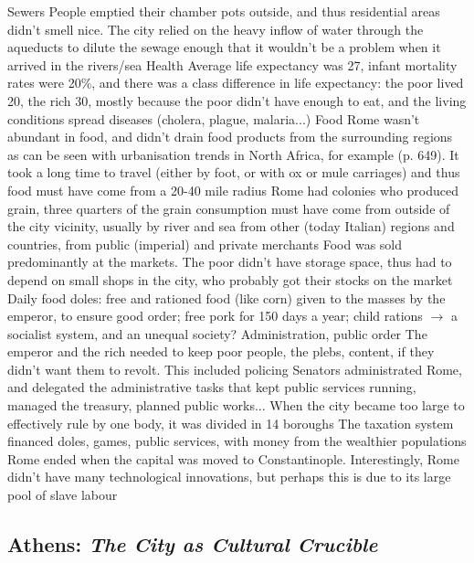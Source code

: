 \documentclass{article}
\begin{document}
\begin{outline}
	\1 Sewers
		\2 People emptied their chamber pots outside, and thus residential areas didn't smell nice. The city relied on the heavy inflow of water through the aqueducts to dilute the sewage enough that it wouldn't be a problem when it arrived in the rivers/sea
	\1 Health
		\2 Average life expectancy was 27, infant mortality rates were 20\%, and there was a class difference in life expectancy: the poor lived 20, the rich 30, mostly because the poor didn't have enough to eat, and the living conditions spread diseases (cholera, plague, malaria...)
	\1 Food
		\2 Rome wasn't abundant in food, and didn't drain food products from the surrounding regions as can be seen with urbanisation trends in North Africa, for example (p. 649). It took a long time to travel (either by foot, or with ox or mule carriages) and thus food must have come from a 20-40 mile radius
		\2 Rome had colonies who produced grain, three quarters of the grain consumption must have come from outside of the city vicinity, usually by river and sea from other (today Italian) regions and countries, from public (imperial) and private merchants
		\2 Food was sold predominantly at the markets. The poor didn't have storage space, thus had to depend on small shops in the city, who probably got their stocks on the market
		\2 Daily food doles: free and rationed food (like corn) given to the masses by the emperor, to ensure good order; free pork for 150 days a year; child rations $\rightarrow$ a socialist system, and an unequal society?
	\1 Administration, public order
		\2 The emperor and the rich needed to keep poor people, the plebs, content, if they didn't want them to revolt. This included policing
		\2 Senators administrated Rome, and delegated the administrative tasks that kept public services running, managed the treasury, planned public works...
		\2 When the city became too large to effectively rule by one body, it was divided in 14 boroughs
		\2 The taxation system financed doles, games, public services, with money from the wealthier populations
	\1 Rome ended when the capital was moved to Constantinople. Interestingly, Rome didn't have many technological innovations, but perhaps this is due to its large pool of slave labour
\end{outline}

\subsection{Athens: \textit{The City as Cultural Crucible} \parencite{hall1998cities}}
\end{document}
